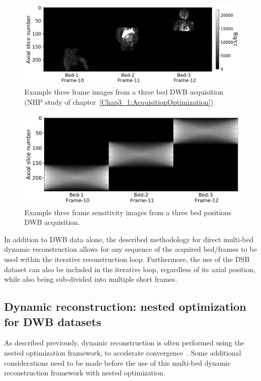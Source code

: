 %
\begin{figure} [ht!]
\includegraphics[scale=0.5,angle=0]{3_Results/3_3_DWB_Reconstruction/figures/Macaque_3D.pdf}
\caption{Example three frame images from a three bed DWB acquisition (NHP study of chapter~\ref{Chap3_1:AcquisitionOptimization})} 
\label{fig_3_3:Macaque}
\end{figure} 
%
\begin{figure} [ht!]
\includegraphics[scale=0.42,angle=0]{3_Results/3_3_DWB_Reconstruction/figures/Macaque_Sensitivity.pdf}
\caption{Example three frame sensitivity images from a three bed positions DWB acquisition.} 
\label{fig_3_3:Macaque_Sensitivity}
\end{figure} 
%
In addition to DWB data alone, the described methodology for direct multi-bed dynamic reconstruction allows for any sequence of the acquired bed/frames to be used within the iterative reconstruction loop. Furthermore, the use of the DSB dataset can also be included in the iterative loop, regardless of its axial position, while also being sub-divided into multiple short frames.

\subsection{Dynamic reconstruction: nested optimization for DWB datasets}
As described previously, dynamic reconstruction is often performed using the nested optimization framework, to accelerate convergence~\cite{Wang2010,Matthews2010}.
Some additional considerations need to be made before the use of this multi-bed dynamic reconstruction framework with nested optimization.

